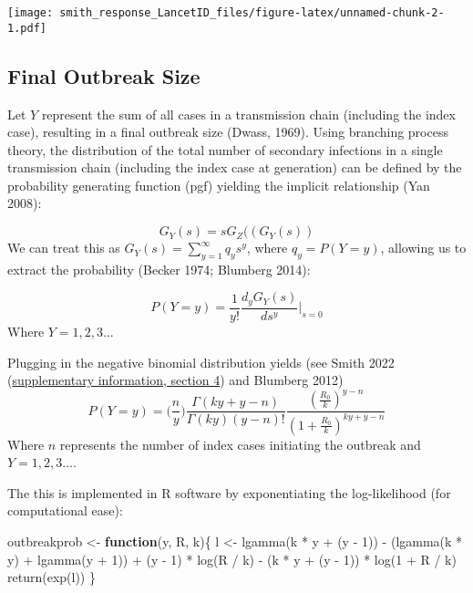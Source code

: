 \documentclass[
]{article}
\newenvironment{Shaded}{\begin{snugshade}}{\end{snugshade}}
\newcommand{\ControlFlowTok}[1]{\textcolor[rgb]{0.13,0.29,0.53}{\textbf{#1}}}
\newcommand{\DecValTok}[1]{\textcolor[rgb]{0.00,0.00,0.81}{#1}}
\newcommand{\FunctionTok}[1]{\textcolor[rgb]{0.00,0.00,0.00}{#1}}
\newcommand{\NormalTok}[1]{#1}
\newcommand{\OtherTok}[1]{\textcolor[rgb]{0.56,0.35,0.01}{#1}}
\newcommand{\SpecialCharTok}[1]{\textcolor[rgb]{0.00,0.00,0.00}{#1}}
\begin{document}
\texttt{[image: smith\_response\_LancetID\_files/figure-latex/unnamed-chunk-2-1.pdf]}

\hypertarget{final-outbreak-size}{%
\subsection{Final Outbreak Size}\label{final-outbreak-size}}

Let \(Y\) represent the sum of all cases in a transmission chain
(including the index case), resulting in a final outbreak size (Dwass,
1969). Using branching process theory, the distribution of the total
number of secondary infections in a single transmission chain (including
the index case at generation) can be defined by the probability
generating function (pgf) yielding the implicit relationship (Yan 2008):

\[G_Y(s) = sG_Z((G_Y(s))\] We can treat this as
\(G_Y(s) = \sum_{y=1}^\infty q_ys^y\), where \(q_y = P(Y=y)\), allowing
us to extract the probability (Becker 1974; Blumberg 2014):

\[
P(Y=y)=\frac{1}{y!}\frac{d_yG_Y(s)}{ds^y}\Bigg|_{s=0}
\] Where \(Y=1, 2, 3\dots\)

Plugging in the negative binomial distribution yields (see Smith 2022
(\href{}{supplementary information, section 4}) and Blumberg 2012) \[
P(Y=y)=\bigg(\frac{n}{y}\bigg)\frac{\Gamma(ky+y-n)}{\Gamma(ky)(y-n)!}\frac{(\frac{R_0}{k})^{y-n}}{(1+\frac{R_0}{k})^{ky+y-n}}
\] Where \(n\) represents the number of index cases initiating the
outbreak and \(Y=1, 2, 3\dots\).

The this is implemented in R software by exponentiating the
log-likelihood (for computational ease):

\begin{Shaded}
\begin{Highlighting}[]
\NormalTok{outbreakprob }\OtherTok{\textless{}{-}} \ControlFlowTok{function}\NormalTok{(y, R, k)\{}
\NormalTok{  l }\OtherTok{\textless{}{-}} \FunctionTok{lgamma}\NormalTok{(k }\SpecialCharTok{*}\NormalTok{ y }\SpecialCharTok{+}\NormalTok{ (y }\SpecialCharTok{{-}} \DecValTok{1}\NormalTok{)) }\SpecialCharTok{{-}}\NormalTok{ (}\FunctionTok{lgamma}\NormalTok{(k }\SpecialCharTok{*}\NormalTok{ y) }\SpecialCharTok{+} \FunctionTok{lgamma}\NormalTok{(y }\SpecialCharTok{+} \DecValTok{1}\NormalTok{)) }\SpecialCharTok{+}\NormalTok{ (y }\SpecialCharTok{{-}} \DecValTok{1}\NormalTok{) }\SpecialCharTok{*} \FunctionTok{log}\NormalTok{(R }\SpecialCharTok{/}\NormalTok{ k) }\SpecialCharTok{{-}}\NormalTok{ (k }\SpecialCharTok{*}\NormalTok{ y }\SpecialCharTok{+}\NormalTok{ (y }\SpecialCharTok{{-}} \DecValTok{1}\NormalTok{)) }\SpecialCharTok{*} \FunctionTok{log}\NormalTok{(}\DecValTok{1} \SpecialCharTok{+}\NormalTok{ R }\SpecialCharTok{/}\NormalTok{ k)}
  \FunctionTok{return}\NormalTok{(}\FunctionTok{exp}\NormalTok{(l))}
\NormalTok{\}}
\end{Highlighting}
\end{Shaded}
\end{document}

